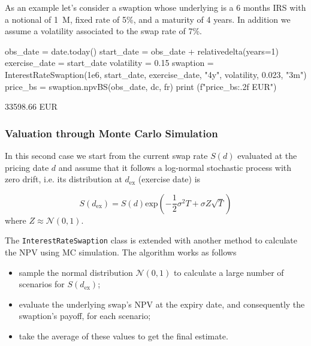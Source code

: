 As an example let's consider a swaption whose underlying is a 6 months IRS with a notional of 1~M, fixed rate of 5\%, and a maturity of 4 years. In addition we assume a volatility associated to the swap rate of 7\%.

\begin{ipython}
obs_date = date.today()
start_date = obs_date + relativedelta(years=1)
exercise_date = start_date
volatility = 0.15
swaption = InterestRateSwaption(1e6, start_date, exercise_date, "4y",
                                volatility, 0.023, "3m")
price_bs = swaption.npvBS(obs_date, dc, fr)
print (f"{price_bs:.2f} EUR")
\end{ipython}
\begin{ioutput}
33598.66 EUR
\end{ioutput}

\subsubsection{Valuation through Monte Carlo Simulation}
\label{evaluation-through-monte-carlo-simulation}

In this second case we start from the current swap rate $S(d)$ evaluated at the pricing date $d$ and assume that it follows a log-normal stochastic process with zero drift, i.e. its distribution at $d_{\mathrm{ex}}$ (exercise date) is 

\begin{equation*}
S(d_{\mathrm{ex}}) = S(d)\mathrm{exp}(-\frac{1}{2}\sigma^{2}T+\sigma Z\sqrt{T})
\end{equation*}
\noindent
where $Z\approx\mathcal{N}(0,1)$. %

\begin{finmarkets}
The \texttt{InterestRateSwaption} class is extended with another method to calculate the NPV using MC simulation.
The algorithm works as follows

\begin{itemize}
\tightlist
\item sample the normal distribution $\mathcal{N}(0, 1)$ to calculate a large number of scenarios for $S(d_{\mathrm{ex}})$;
\item evaluate the underlying swap's NPV at the expiry date, and consequently the swaption's payoff, for each scenario;
\item take the average of these values to get the final estimate.
\end{itemize}
\end{finmarkets}

